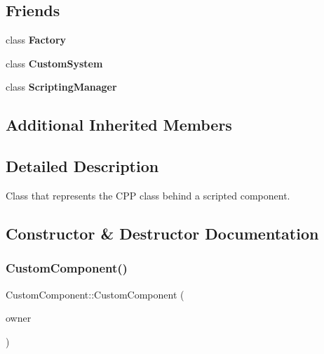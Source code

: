 \subsection*{Friends}
\begin{DoxyCompactItemize}
\item 
\mbox{\label{classCustomComponent_a328c093d609680cca505905c6d49901a}} 
class {\bfseries Factory}
\item 
\mbox{\label{classCustomComponent_ad53c39bc0891ebd13eca5e98a09ab765}} 
class {\bfseries Custom\+System}
\item 
\mbox{\label{classCustomComponent_ab3d6fafb2064bace492fd6b503d044f4}} 
class {\bfseries Scripting\+Manager}
\end{DoxyCompactItemize}
\subsection*{Additional Inherited Members}


\subsection{Detailed Description}
Class that represents the C\+PP class behind a scripted component. 

\subsection{Constructor \& Destructor Documentation}
\mbox{\label{classCustomComponent_a748e48455ac06076251485d3a112140f}} 
\subsubsection{\texorpdfstring{Custom\+Component()}{CustomComponent()}}
{\footnotesize\ttfamily Custom\+Component\+::\+Custom\+Component (\begin{DoxyParamCaption}\item[{\hyperlink{classGameObject}{Game\+Object} $\ast$}]{owner }\end{DoxyParamCaption})}



